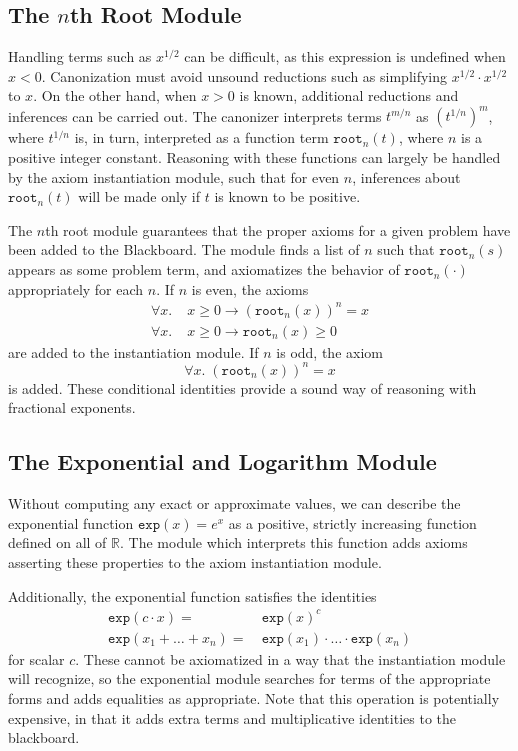 \documentclass[runningheds]{llncs}
\newcommand{\RR}{\mathbb{R}}
\newcommand{\fn}[1]{\mathtt{#1}} \newcommand{\nroot}{\fn{root}}
\begin{document}
\subsection{The $n$th Root Module}
Handling terms such as $x^{1/2}$ can be difficult, as this expression is undefined when $x<0$. Canonization must avoid unsound reductions such as simplifying $x^{1/2} \cdot x^{1/2}$ to $x$. On the other hand, when $x > 0$ is known, additional reductions and inferences can be carried out. The canonizer interprets terms $t^{m / n}$ as $(t^{1/n})^m$, where $t^{1/n}$ is, in turn, interpreted as a function term $\nroot_n(t)$, where $n$ is a positive integer constant. Reasoning with these functions can largely be handled by the axiom instantiation module, such that for even $n$, inferences about $\nroot_n(t)$ will be made only if $t$ is known to be positive.

The $n$th root module guarantees that the proper axioms for a given problem have been added to the Blackboard. The module finds a list of $n$ such that $\nroot_n(s)$ appears as some problem term, and axiomatizes the behavior of $\nroot_n(\cdot)$ appropriately for each $n$. If $n$ is even, the axioms
\begin{align*}
 \forall x. \; & x \geq 0 \to (\nroot_n(x))^n = x \\
 \forall x. \; & x \geq 0 \to \nroot_n(x) \geq 0
\end{align*}
are added to the instantiation module. If $n$ is odd, the axiom
$$ \forall x. \; (\nroot_n(x))^n = x $$
is added. These conditional identities provide a sound way of reasoning with fractional exponents.

\subsection{The Exponential and Logarithm Module}
\label{subsection:exponential}
Without computing any exact or approximate values, we can describe the exponential function $\fn{exp}(x)=e^x$ as a positive, strictly increasing function defined on all of $\RR$. The module which interprets this function adds axioms asserting these properties to the axiom instantiation module.

Additionally, the exponential function satisfies the identities 
\begin{align*}
 \fn{exp}(c\cdot x) =&\ \fn{exp}(x)^c \\
 \fn{exp}(x_1 + \ldots + x_n) =&\ \fn{exp}(x_1)\cdot \ldots \cdot \fn{exp}(x_n)
\end{align*}
for scalar $c$. These cannot be axiomatized in a way that the instantiation module will recognize, so the exponential module searches for terms of the appropriate forms and adds equalities as appropriate. Note that this operation is potentially expensive, in that it adds extra terms and multiplicative identities to the blackboard.
\end{document}

